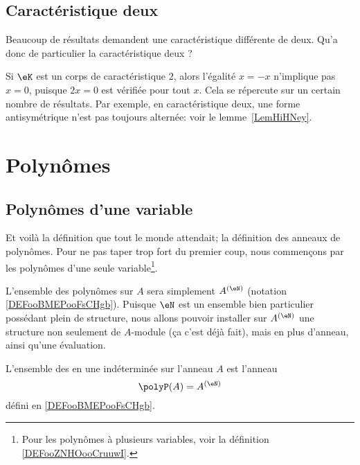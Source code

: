 \subsection{Caractéristique deux}

Beaucoup de résultats demandent une caractéristique différente de deux. Qu'a donc de particulier la caractéristique deux ?

Si \( \eK\) est un corps de caractéristique \( 2\), alors l'égalité \( x=-x\) n'implique pas \( x=0\), puisque \( 2x=0\) est vérifiée pour tout \( x\). Cela se répercute sur un certain nombre de résultats. Par exemple, en caractéristique deux, une forme antisymétrique n'est pas toujours alternée: voir le lemme~\ref{LemHiHNey}.

\section{Polynômes}

\subsection{Polynômes d'une variable}

Et voilà la définition que tout le monde attendait; la définition des anneaux de polynômes. Pour ne pas taper trop fort du premier coup, nous commençons par les polynômes d'une seule variable\footnote{Pour les polynômes à plusieurs variables, voir la définition \ref{DEFooZNHOooCruuwI}.}.


L'ensemble des polynômes sur \( A\) sera simplement \( A^{(\eN)}\) (notation \ref{DEFooBMEPooFsCHgb}). Puisque \( \eN\) est un ensemble bien particulier possédant plein de structure, nous allons pouvoir installer sur \( A^{(\eN)}\) une structure non seulement de \( A\)-module (ça c'est déjà fait), mais en plus d'anneau, ainsi qu'une évaluation.
\begin{definition}      \label{DEFooFYZRooMikwEL}
    L'ensemble des  en une indéterminée sur l'anneau \( A\) est l'anneau 
    \begin{equation}
        \polyP(A)=A^{(\eN)}
    \end{equation}
    défini en \ref{DEFooBMEPooFsCHgb}.
\end{definition}

